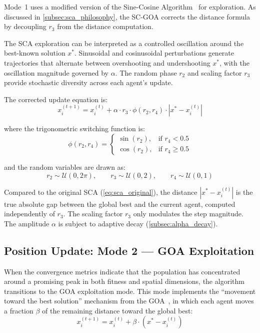 \documentclass[a4paper, 12pt]{article}
\begin{document}
Mode~1 uses a modified version of the Sine-Cosine Algorithm~\cite{mirjalili2016sca} for exploration. As discussed in \cref{subsec:sca_philosophy}, the SC-GOA corrects the distance formula by decoupling $r_3$ from the distance computation.

The SCA exploration can be interpreted as a controlled oscillation around the best-known solution $x^{*}$. Sinusoidal and cosinusoidal perturbations generate trajectories that alternate between overshooting and undershooting $x^{*}$, with the oscillation magnitude governed by $\alpha$. The random phase $r_2$ and scaling factor $r_3$ provide stochastic diversity across each agent's update.

The corrected update equation is:
\begin{equation}
    x_i^{(t+1)} = x_i^{(t)} + \alpha \cdot r_3 \cdot \phi(r_2, r_4) \cdot \left| x^{*} - x_i^{(t)} \right|
    \label{eq:sca_update}
\end{equation}

where the trigonometric switching function is:
\begin{equation}
    \phi(r_2, r_4) =
    \begin{cases}
        \sin(r_2), & \text{if } r_4 < 0.5 \\[4pt]
        \cos(r_2), & \text{if } r_4 \geq 0.5
    \end{cases}
    \label{eq:trig_switch}
\end{equation}

and the random variables are drawn as:
\begin{equation}
    r_2 \sim \mathcal{U}(0, 2\pi), \qquad r_3 \sim \mathcal{U}(0, 2), \qquad r_4 \sim \mathcal{U}(0, 1)
    \label{eq:sca_randoms}
\end{equation}

Compared to the original SCA (\cref{eq:sca_original}), the distance $|x^{*} - x_i^{(t)}|$ is the true absolute gap between the global best and the current agent, computed independently of $r_3$. The scaling factor $r_3$ only modulates the step magnitude. The amplitude $\alpha$ is subject to adaptive decay (\cref{subsec:alpha_decay}).


\subsection{Position Update: Mode 2 --- GOA Exploitation}
\label{subsec:mode2}

When the convergence metrics indicate that the population has concentrated around a promising peak in both fitness and spatial dimensions, the algorithm transitions to the GOA exploitation mode. This mode implements the ``movement toward the best solution'' mechanism from the GOA~\cite{nozari2025goa}, in which each agent moves a fraction $\beta$ of the remaining distance toward the global best:
\begin{equation}
    x_i^{(t+1)} = x_i^{(t)} + \beta \cdot \left( x^{*} - x_i^{(t)} \right)
    \label{eq:goa_exploit}
\end{equation}
\end{document}
